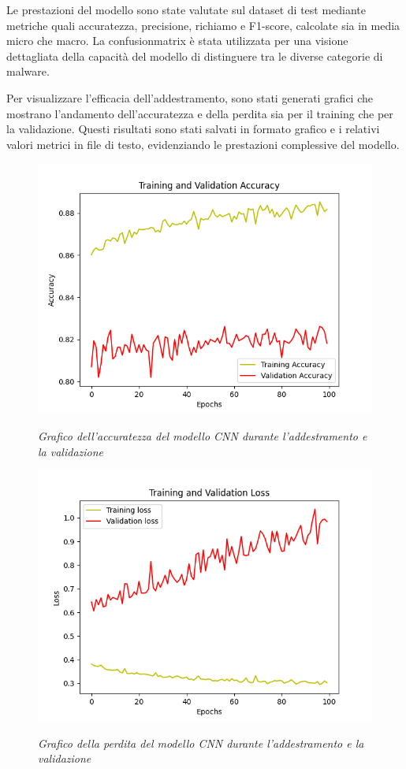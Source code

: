Le prestazioni del modello sono state valutate sul dataset di test mediante metriche quali accuratezza, precisione, richiamo e F1-score, calcolate sia in media micro che macro. La \gls{confusionmatrix} è stata utilizzata per una visione dettagliata della capacità del modello di distinguere tra le diverse categorie di malware.

Per visualizzare l'efficacia dell'addestramento, sono stati generati grafici che mostrano l'andamento dell'accuratezza e della perdita sia per il training che per la validazione. Questi risultati sono stati salvati in formato grafico e i relativi valori metrici in file di testo, evidenziando le prestazioni complessive del modello.

\newpage
\begin{figure}[ht]
    \centering
        \centering
        \includegraphics[width=0.7\linewidth]{images/cnn_accuracy.png}
        \label{fig:cnn_accuracy}
        \caption{\emph{Grafico dell'accuratezza del modello CNN durante l'addestramento e la validazione}}
\end{figure}

\begin{figure}[ht]
    \centering
        \centering
        \includegraphics[width=0.7\linewidth]{images/cnn_loss.png}
        \label{fig:cnn_loss}
        \caption{\emph{Grafico della perdita del modello CNN durante l'addestramento e la validazione}}
\end{figure}

